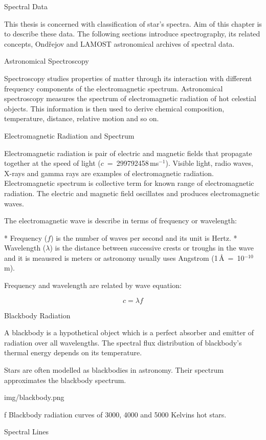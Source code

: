 \chap Spectral Data

This thesis is concerned with classification of star's spectra.
Aim of this chapter is to describe these data.
The following sections introduce spectrography, its related concepts,
Ondřejov and LAMOST astronomical archives of spectral data.

\sec Astronomical Spectroscopy

Spectroscopy studies properties of matter through its
interaction with different frequency components of the
electromagnetic spectrum. Astronomical spectroscopy
measures the spectrum of electromagnetic radiation of
hot celestial objects. This information is then used to
derive chemical composition, temperature,
distance, relative motion and so on.

\sec Electromagnetic Radiation and Spectrum

Electromagnetic radiation is pair of electric and magnetic
fields that propagate together at the speed of light
($c$~=~299792458\,ms$^{-1}$).
Visible light, radio waves, X-rays and gamma rays are
examples of electromagnetic radiation. Electromagnetic
spectrum is collective term for known range of
electromagnetic radiation. The electric and magnetic field
oscillates and produces electromagnetic waves.

The electromagnetic wave is describe in terms of frequency
or wavelength:

\begitems    
* Frequency ($f$) is the number of waves per second and
its unit is Hertz.
* Wavelength ($\lambda$) is the distance between successive
crests or troughs in the wave and it is meausred is meters
or astronomy usually uses Angstrom (1\,\AA~=~10$^{-10}$\,m).
\enditems

Frequency and wavelength are related by wave equation:

$$
c = \lambda f
$$

\sec Blackbody Radiation

A blackbody is a hypothetical object which is a perfect
absorber and emitter of radiation over all wavelengths.
The spectral flux distribution of blackbody's thermal
energy depends on its temperature.

Stars are often modelled as blackbodies in astronomy.
Their spectrum approximates the blackbody spectrum.

\medskip
\picw=15cm \cinspic img/blackbody.png
\caption/f Blackbody radiation curves of 3000, 4000 and 5000 Kelvins hot
stars.
\medskip

\sec Spectral Lines

